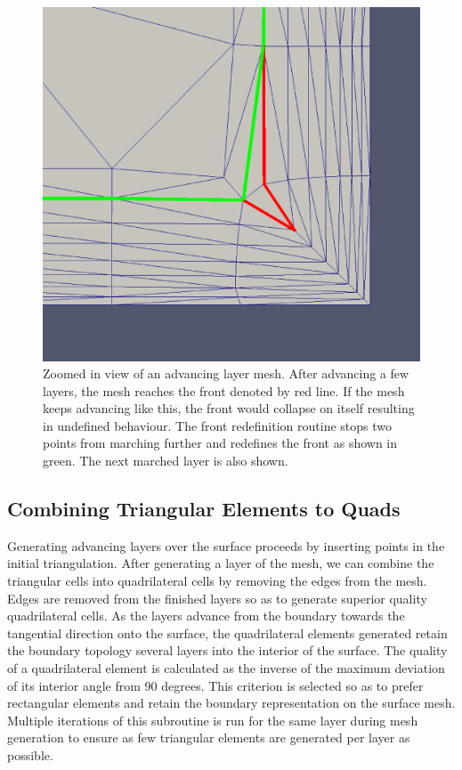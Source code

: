 \documentclass[conf]{new-aiaa}
\begin{document}
\begin{figure}[hbt!]
    \centering
    \includegraphics[width=.5\textwidth]{front-before-n-after-redefinition.eps}
    \caption{Zoomed in view of an advancing layer mesh. After advancing a few layers, the mesh reaches the front denoted by red line. If the mesh keeps advancing like this, the front would collapse on itself resulting in undefined behaviour. The front redefinition routine stops two points from marching further and redefines the front as shown in green. The next marched layer is also shown.}
    \label{front-redef}
\end{figure}

\subsection{Combining Triangular Elements to Quads}

Generating advancing layers over the surface proceeds by inserting points in the initial triangulation. After generating a layer of the mesh, we can combine the triangular cells into quadrilateral cells by removing the edges from the mesh. Edges are removed from the finished layers so as to generate superior quality quadrilateral cells. As the layers advance from the boundary towards the tangential direction onto the surface, the quadrilateral elements generated retain the boundary topology several layers into the interior of the surface. The quality of a quadrilateral element is calculated as the inverse of the maximum deviation of its interior angle from 90 degrees. This criterion is selected so as to prefer rectangular elements and retain the boundary representation on the surface mesh. Multiple iterations of this subroutine is run for the same layer during mesh generation to ensure as few triangular elements are generated per layer as possible.

\end{document}
